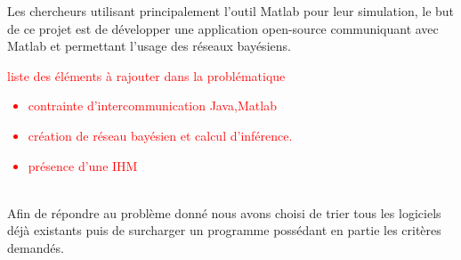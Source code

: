 \documentclass[conference]{IEEEtran}
\begin{document}
\tableofcontents
\vspace{0.8cm}
Les chercheurs utilisant principalement l'outil Matlab pour leur simulation, le but de ce projet est de développer une application open-source communiquant avec Matlab et permettant l'usage des réseaux bayésiens. \\

\textcolor{red}{
	liste des éléments à rajouter dans la problématique
	\begin{itemize}
	\item contrainte d'intercommunication Java,Matlab
	\item création de réseau bayésien et calcul d'inférence.
	\item présence d'une IHM
	\end{itemize}
}

\\
Afin de répondre au problème donné nous avons choisi de trier tous les logiciels déjà existants puis de surcharger un programme possédant en partie les critères demandés. \\




%
%

\end{document}

